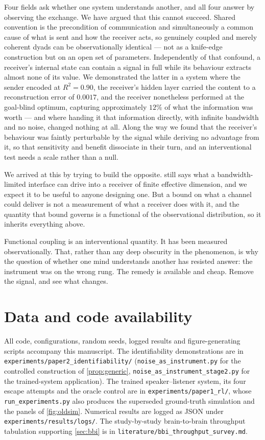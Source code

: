 \documentclass[11pt,a4paper]{article}
\theoremstyle{plain}
\theoremstyle{definition}
\theoremstyle{remark}
\newcommand{\code}[1]{\texttt{\small #1}}
\begin{document}
Four fields ask whether one system understands another, and all four answer by observing the exchange. We have
argued that this cannot succeed. Shared convention is the precondition of communication and simultaneously a
common cause of what is sent and how the receiver acts, so genuinely coupled and merely coherent dyads can be
observationally identical --- not as a knife-edge construction but on an open set of parameters. Independently
of that confound, a receiver's internal state can contain a signal in full while its behaviour extracts almost
none of its value. We demonstrated the latter in a system where the sender encoded at $R^2 = 0.90$, the
receiver's hidden layer carried the content to a reconstruction error of $0.0017$, and the receiver nonetheless
performed at the goal-blind optimum, capturing approximately $12\%$ of what the information was worth --- and where
handing it that information directly, with infinite bandwidth and no noise, changed nothing at all. Along the
way we found that the receiver's behaviour was faintly perturbable by the signal while deriving no advantage
from it, so that sensitivity and benefit dissociate in their turn, and an interventional test needs a scale
rather than a null.

We arrived at this by trying to build the opposite.  still says what a
bandwidth-limited interface can drive into a receiver of finite effective dimension, and we
expect it to be useful to anyone designing one. But a bound on what a channel could deliver is
not a measurement of what a receiver does with it, and the quantity that bound governs is a
functional of the observational distribution, so it inherits everything above.

Functional coupling is an interventional quantity. It has been measured observationally. That, rather than any
deep obscurity in the phenomenon, is why the question of whether one mind understands another has resisted
answer: the instrument was on the wrong rung. The remedy is available and cheap. Remove the signal, and see what
changes.

\section*{Data and code availability}

All code, configurations, random seeds, logged results and figure-generating scripts accompany this manuscript.
The identifiability demonstrations are in \code{experiments/paper2\_identifiability/} (\code{noise\_as\_instrument.py}
for the controlled construction of \cref{prop:generic}, \code{noise\_as\_instrument\_stage2.py} for the trained-system
application). The trained speaker--listener system, its four escape attempts and the oracle control are in
\code{experiments/paper1\_rl/}, whose \code{run\_experiments.py} also produces the
superseded ground-truth simulation and the panels of \cref{fig:oldsim}. Numerical results are logged as JSON under \code{experiments/results/logs/}. The
study-by-study brain-to-brain throughput tabulation supporting \cref{sec:bbi} is in
\code{literature/bbi\_throughput\_survey.md}.
\end{document}
